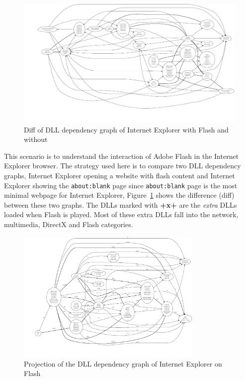 \begin{figure}
\includegraphics[width=1.0\textwidth]{depvis/ie-yt-diff.pdf}
\caption{Diff of DLL dependency graph of Internet Explorer with Flash and without}
\label{fig:ie-diff}
\end{figure}

This scenario is to understand the interaction of Adobe Flash in
the Internet Explorer browser.
The strategy used here is to compare two DLL dependency graphs,
Internet Explorer opening a website with flash content and
Internet Explorer showing the {\tt about:blank} page since
{\tt about:blank} page is the most minimal webpage for Internet Explorer,
Figure~\ref{fig:ie-diff} shows the difference (diff) between these two
graphs.
The DLLs marked with {\bf +x+} are the {\em extra} DLLs loaded
when Flash is played.
Most of these extra DLLs fall into the
network, multimedia, DirectX and Flash categories.

\begin{figure}
\centering
\includegraphics[keepaspectratio,width=0.8\textwidth,height=0.8\textheight]{depvis/ie-yt-proj.pdf}
\caption{Projection of the DLL dependency graph of Internet Explorer on Flash}
\label{fig:ie-proj}
\end{figure}

